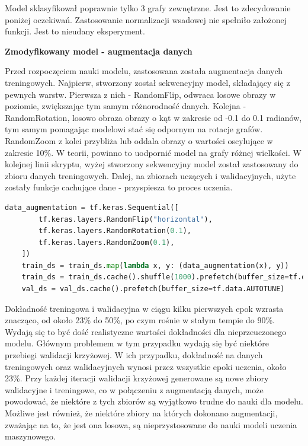 Model sklasyfikował poprawnie tylko 3 grafy zewnętrzne. Jest to zdecydowanie poniżej oczekiwań.
Zastosowanie normalizacji wsadowej nie spełniło założonej funkcji. Jest to nieudany eksperyment.

\textbf{Zmodyfikowany model - augmentacja danych}

Przed rozpoczęciem nauki modelu, zastosowana została augmentacja danych treningowych.
Najpierw, stworzony został sekwencyjny model, składający się z pewnych warstw.
Pierwsza z nich - RandomFlip, odwraca losowe obrazy w poziomie, zwiększając tym samym różnorodność danych.
Kolejna - RandomRotation, losowo obraza obrazy o kąt w zakresie od -0.1 do 0.1 radianów,
tym samym pomagając modelowi stać się odpornym na rotacje grafów.
RandomZoom z kolei przybliża lub oddala obrazy o wartości oscylujące w zakresie 10\%.
W teorii, powinno to uodpornić model na grafy różnej wielkości.
W kolejnej linii skryptu, wyżej stworzony sekwencyjny model został zastosowany do zbioru danych treningowych.
Dalej, na zbiorach uczących i walidacyjnych, użyte zostały funkcje cachujące dane - przyspiesza to proces uczenia.

\begin{lstlisting}[language=Python,caption=Listing zmodyfikowanego skryptu poprzedzającego tworzenie modelu z walidacją krzyżową
	- wersja 3,label={tests-model-crossval3}]
	data_augmentation = tf.keras.Sequential([
        tf.keras.layers.RandomFlip("horizontal"),
        tf.keras.layers.RandomRotation(0.1),
        tf.keras.layers.RandomZoom(0.1),
    ])
    train_ds = train_ds.map(lambda x, y: (data_augmentation(x), y))
    train_ds = train_ds.cache().shuffle(1000).prefetch(buffer_size=tf.data.AUTOTUNE)
    val_ds = val_ds.cache().prefetch(buffer_size=tf.data.AUTOTUNE)
\end{lstlisting}

Dokładność treningowa i walidacyjna w ciągu kilku pierwszych epok wzrasta znacząco,
od około 23\% do 50\%, po czym rośnie w stałym tempie do 90\%.
Wydają się to być dość realistyczne wartości dokładności dla nieprzeuczonego modelu.
Głównym problemem w tym przypadku wydają się być niektóre przebiegi walidacji krzyżowej.
W ich przypadku, dokładność na danych treningowych oraz walidacyjnych wynosi przez wszystkie epoki uczenia, około 23\%.
Przy każdej iteracji walidacji krzyżowej generowane są nowe zbiory walidacyjne i treningowe,
co w połączeniu z augmentacją danych, może powodować, że niektóre z tych zbiorów są wyjątkowo trudne do nauki dla modelu.
Możliwe jest również, że niektóre zbiory na których dokonano augmentacji, zważając na to, że jest ona losowa,
są nieprzystosowane do nauki modeli uczenia maszynowego.

